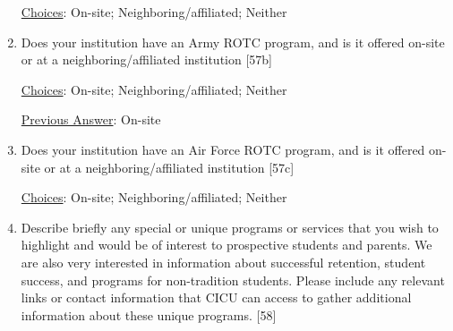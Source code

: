 \documentclass[12 pt, a4paper]{article}
\begin{document}
\begin{Form}
\begin{enumerate}
\underline{Choices}: On-site; Neighboring/affiliated; Neither\medskip

\TextField[width = 6 in,multiline, name=90122]{} \medskip

\item Does your institution have an Army ROTC program, and is it offered on-site or at a neighboring/affiliated institution [57b] \medskip

\underline{Choices}: On-site; Neighboring/affiliated; Neither\medskip

\underline{Previous Answer}: On-site\medskip

\TextField[width = 6 in,multiline, name=90123]{} \medskip

\item Does your institution have an Air Force ROTC program, and is it offered on-site or at a neighboring/affiliated institution [57c] \medskip

\underline{Choices}: On-site; Neighboring/affiliated; Neither\medskip

\TextField[width = 6 in,multiline, name=90124]{} \medskip

\item Describe briefly any special or unique programs or services that you wish to highlight and would be of interest to prospective students and parents. We are also very interested in information about successful retention, student success, and programs for non-tradition students. Please include any relevant links or contact information that CICU can access to gather additional information about these unique programs. [58] \medskip

\TextField[width = 6 in,multiline, name=90125]{} \medskip

\end{enumerate}
\newpage
\end{Form}
\end{document}
